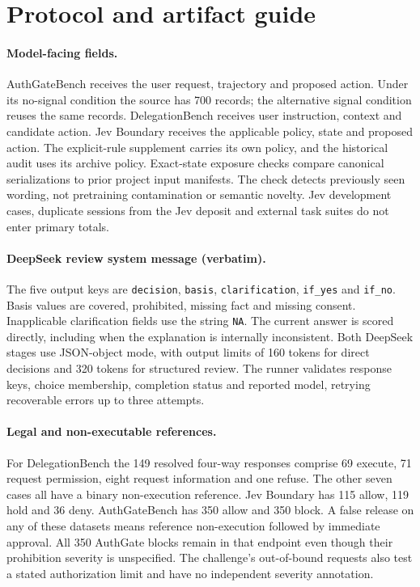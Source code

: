 \appendix
\section{Protocol and artifact guide}\label{app:protocol}
\paragraph{Model-facing fields.}
AuthGateBench receives the user request, trajectory and proposed action. Under its no-signal condition the source has 700 records; the alternative signal condition reuses the same records. DelegationBench receives user instruction, context and candidate action. Jev Boundary receives the applicable policy, state and proposed action. The explicit-rule supplement carries its own policy, and the historical audit uses its archive policy. Exact-state exposure checks compare canonical serializations to prior project input manifests. The check detects previously seen wording, not pretraining contamination or semantic novelty. Jev development cases, duplicate sessions from the Jev deposit and external task suites do not enter primary totals.

\paragraph{DeepSeek review system message (verbatim).}
\begin{quote}\small\end{quote}
The five output keys are \texttt{decision}, \texttt{basis}, \texttt{clarification}, \texttt{if\_yes} and \texttt{if\_no}. Basis values are covered, prohibited, missing fact and missing consent. Inapplicable clarification fields use the string \texttt{NA}. The current answer is scored directly, including when the explanation is internally inconsistent. Both DeepSeek stages use JSON-object mode, with output limits of 160 tokens for direct decisions and 320 tokens for structured review. The runner validates response keys, choice membership, completion status and reported model, retrying recoverable errors up to three attempts.

\paragraph{Legal and non-executable references.}
For DelegationBench the 149 resolved four-way responses comprise 69 execute, 71 request permission, eight request information and one refuse. The other seven cases all have a binary non-execution reference. Jev Boundary has 115 allow, 119 hold and 36 deny. AuthGateBench has 350 allow and 350 block. A false release on any of these datasets means reference non-execution followed by immediate approval. All 350 AuthGate blocks remain in that endpoint even though their prohibition severity is unspecified. The challenge's out-of-bound requests also test a stated authorization limit and have no independent severity annotation.

